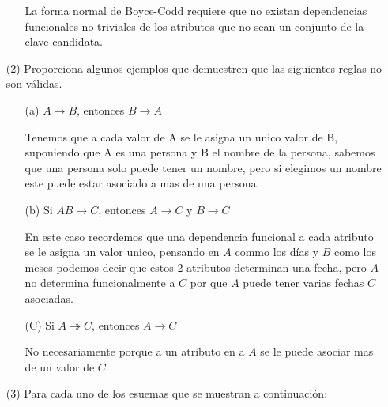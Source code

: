 \documentclass{article}
\begin{document}
\begin{enumerate}
\begin{enumerate}
      La forma normal de Boyce-Codd requiere que no existan dependencias
      funcionales no triviales de los atributos que no sean un conjunto de la
      clave candidata.
    \end{enumerate}
  \item[(2)] Proporciona algunos ejemplos que demuestren que las siguientes reglas
  no son válidas.
    \begin{enumerate}
      \item[(a)] $A \rightarrow B$, entonces $B \rightarrow A$

      Tenemos que a cada valor de A se le asigna un unico valor de B,
      suponiendo que A es una persona y B el nombre de la persona, sabemos que una
      persona solo puede tener un nombre, pero si elegimos un nombre este puede
      estar asociado a mas de una persona.
      \item[(b)] Si $AB \rightarrow C$, entonces $A \rightarrow C$ y $B \rightarrow C$

      En este caso recordemos que una dependencia funcional a cada atributo se le
      asigna un valor unico, pensando en $A$ commo los días y $B$ como los meses
      podemos decir que estos 2 atributos determinan una fecha, pero $A$ no
      determina funcionalmente a $C$ por que $A$ puede tener varias fechas $C$
      asociadas.

      \item[(C)] Si $A \twoheadrightarrow C$, entonces $A \rightarrow C$

      No necesariamente porque a un atributo en a $A$ se le puede asociar mas de
      un valor de $C$.

    \end{enumerate}
    \item[(3)] Para cada uno de los esuemas que se muestran a continuación:
      

\end{enumerate}
\end{document}
